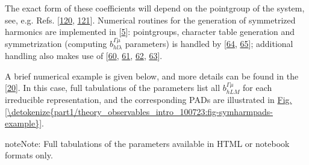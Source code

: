 \documentclass[letterpaper,table,10pt,english]{jupyterBook}
\begin{document}
\sphinxAtStartPar
The exact form of these coefficients will depend on the point\sphinxhyphen{}group of the system, see, e.g. Refs. {[}\hyperlink{cite.backmatter/bibliography:id554}{120}, \hyperlink{cite.backmatter/bibliography:id837}{121}{]}. Numerical routines for the generation of symmetrized harmonics are implemented in  {[}\hyperlink{cite.backmatter/bibliography:id681}{5}{]}: point\sphinxhyphen{}groups, character table generation and symmetrization (computing \(b_{hl\lambda}^{\Gamma\mu}\) parameters) is handled by  {[}\hyperlink{cite.backmatter/bibliography:id707}{64}, \hyperlink{cite.backmatter/bibliography:id708}{65}{]}; additional handling also makes use of  {[}\hyperlink{cite.backmatter/bibliography:id886}{60}, \hyperlink{cite.backmatter/bibliography:id955}{61}, \hyperlink{cite.backmatter/bibliography:id956}{62}, \hyperlink{cite.backmatter/bibliography:id957}{63}{]}.

\sphinxAtStartPar
A brief numerical example is given below, and more details can be found in the  {[}\hyperlink{cite.backmatter/bibliography:id680}{20}{]}. In this case, full tabulations of the parameters list all \(b_{hLM}^{\Gamma\mu}\) for each irreducible representation, and the corresponding PADs are illustrated in \hyperref[\detokenize{part1/theory_observables_intro_100723:fig-symharmpads-example}]{Fig.\@ \ref{\detokenize{part1/theory_observables_intro_100723:fig-symharmpads-example}}}.

\begin{sphinxShadowBox}
\sphinxstylesidebartitle{}

\begin{sphinxadmonition}{note}{Note:}
\sphinxAtStartPar
Full tabulations of the parameters available in HTML or notebook formats only.
\end{sphinxadmonition}
\end{sphinxShadowBox}
\end{document}
